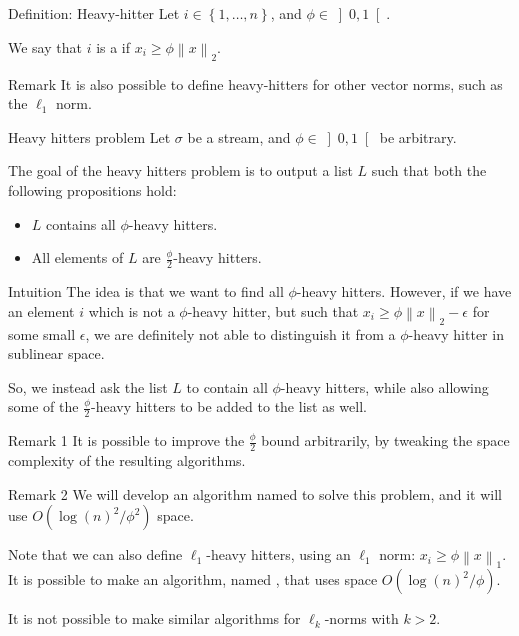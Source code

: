 \documentclass[a4paper]{article}
\begin{document}
\begin{parag}{Definition: Heavy-hitter}
    Let $i \in \left\{1, \ldots, n\right\}$, and $\phi \in \left]0, 1\right[ $.

    We say that $i$ is a  if $x_i \geq \phi \left\|x\right\|_2$.

    \begin{subparag}{Remark}
        It is also possible to define heavy-hitters for other vector norms, such as the $\ell_1$ norm.
    \end{subparag}
\end{parag}

\begin{parag}{Heavy hitters problem}
    Let $\sigma$ be a stream, and $\phi \in \left]0, 1\right[ $ be arbitrary.

    The goal of the heavy hitters problem is to output a list $L$ such that both the following propositions hold:
    \begin{itemize}
        \item $L$ contains all $\phi$-heavy hitters.
        \item All elements of $L$ are $\frac{\phi}{2}$-heavy hitters.
    \end{itemize}

    \begin{subparag}{Intuition}
        The idea is that we want to find all $\phi$-heavy hitters. However, if we have an element $i$ which is not a $\phi$-heavy hitter, but such that $x_i \geq \phi \left\|x\right\|_2 - \epsilon$ for some small $\epsilon$, we are definitely not able to distinguish it from a $\phi$-heavy hitter in sublinear space.

        So, we instead ask the list $L$ to contain all $\phi$-heavy hitters, while also allowing some of the $\frac{\phi}{2}$-heavy hitters to be added to the list as well. 
    \end{subparag}

    \begin{subparag}{Remark 1}
        It is possible to improve the $\frac{\phi}{2}$ bound arbitrarily, by tweaking the space complexity of the resulting algorithms.
    \end{subparag}

    \begin{subparag}{Remark 2}
        We will develop an algorithm named  to solve this problem, and it will use $O\left(\log\left(n\right)^2 / \phi^2\right)$ space.

        Note that we can also define $\ell_1$-heavy hitters, using an $\ell_1$ norm: $x_i \geq \phi \left\|x\right\|_1$. It is possible to make an algorithm, named , that uses space $O\left(\log\left(n\right)^2 / \phi\right)$.

        It is not possible to make similar algorithms for $\ell_k$-norms with $k > 2$.
    \end{subparag}
\end{parag}
\end{document}
